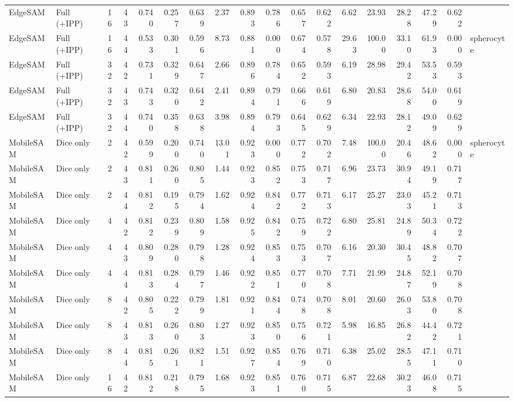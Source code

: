 \documentclass[10pt]{article}
\begin{document}
\begin{landscape}
{\begin{longtable}{l l r r r r r r r r r r r r r r r l}
EdgeSAM & Full (+IPP) & 16 & 43 & 0.740 & 0.257 & 0.639 & 2.37 & 0.893 & 0.786 & 0.657 & 0.622 & 6.62 & 23.93 & 28.28 & 47.29 & 0.622 &  \\
EdgeSAM & Full (+IPP) & 16 & 44 & 0.533 & 0.301 & 0.596 & 8.73 & 0.881 & 0.000 & 0.674 & 0.578 & 29.63 & 100.00 & 33.10 & 61.93 & 0.000 & spherocyte \\
EdgeSAM & Full (+IPP) & 32 & 42 & 0.731 & 0.329 & 0.647 & 2.66 & 0.896 & 0.784 & 0.652 & 0.593 & 6.19 & 28.98 & 29.42 & 53.53 & 0.593 &  \\
EdgeSAM & Full (+IPP) & 32 & 43 & 0.743 & 0.320 & 0.642 & 2.41 & 0.894 & 0.791 & 0.666 & 0.619 & 6.80 & 20.83 & 28.68 & 54.00 & 0.619 &  \\
EdgeSAM & Full (+IPP) & 32 & 44 & 0.740 & 0.358 & 0.638 & 3.98 & 0.894 & 0.793 & 0.645 & 0.629 & 6.34 & 22.93 & 28.12 & 49.09 & 0.629 &  \\
MobileSAM & Dice only & 2 & 42 & 0.599 & 0.200 & 0.740 & 13.01 & 0.923 & 0.000 & 0.772 & 0.702 & 7.48 & 100.00 & 20.46 & 48.62 & 0.000 & spherocyte \\
MobileSAM & Dice only & 2 & 43 & 0.811 & 0.260 & 0.805 & 1.44 & 0.923 & 0.852 & 0.753 & 0.717 & 6.96 & 23.73 & 30.94 & 49.19 & 0.717 &  \\
MobileSAM & Dice only & 2 & 44 & 0.812 & 0.195 & 0.794 & 1.62 & 0.924 & 0.842 & 0.772 & 0.713 & 6.17 & 25.27 & 23.03 & 45.21 & 0.713 &  \\
MobileSAM & Dice only & 4 & 42 & 0.812 & 0.239 & 0.809 & 1.58 & 0.925 & 0.842 & 0.759 & 0.722 & 6.80 & 25.81 & 24.89 & 50.34 & 0.722 &  \\
MobileSAM & Dice only & 4 & 43 & 0.809 & 0.280 & 0.798 & 1.28 & 0.924 & 0.853 & 0.753 & 0.707 & 6.16 & 20.30 & 30.45 & 48.82 & 0.707 &  \\
MobileSAM & Dice only & 4 & 44 & 0.813 & 0.284 & 0.797 & 1.46 & 0.922 & 0.851 & 0.770 & 0.708 & 7.71 & 21.99 & 24.87 & 52.19 & 0.708 &  \\
MobileSAM & Dice only & 8 & 42 & 0.805 & 0.222 & 0.799 & 1.81 & 0.921 & 0.844 & 0.748 & 0.708 & 8.01 & 20.60 & 26.03 & 53.80 & 0.708 &  \\
MobileSAM & Dice only & 8 & 43 & 0.813 & 0.260 & 0.803 & 1.27 & 0.923 & 0.850 & 0.756 & 0.721 & 5.98 & 16.85 & 26.82 & 44.42 & 0.721 &  \\
MobileSAM & Dice only & 8 & 44 & 0.815 & 0.261 & 0.821 & 1.51 & 0.927 & 0.854 & 0.769 & 0.710 & 6.38 & 25.02 & 28.55 & 47.11 & 0.710 &  \\
MobileSAM & Dice only & 16 & 42 & 0.812 & 0.218 & 0.795 & 1.68 & 0.923 & 0.851 & 0.760 & 0.715 & 6.87 & 22.68 & 30.23 & 46.08 & 0.715 &  \\

\end{longtable}}
\end{landscape}
\end{document}
